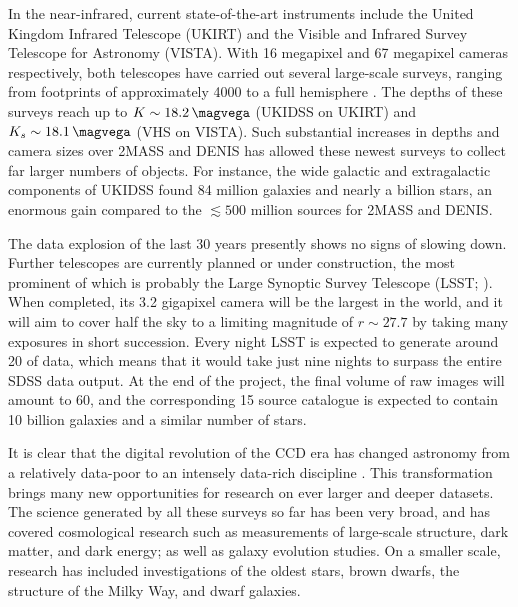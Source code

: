 In the near-infrared, current state-of-the-art instruments include the United Kingdom Infrared Telescope (UKIRT) and the Visible and Infrared Survey Telescope for Astronomy (VISTA). With 16 megapixel and 67 megapixel  cameras respectively, both telescopes have carried out several large-scale surveys, ranging from footprints of approximately \SI{4000}{\sqdeg} to a full hemisphere  \citep{2007MNRAS.379.1599L,2013Msngr.154...35M,2018MNRAS.473.5113D}. The depths of these surveys reach up to $K\sim \SI{18.2}{\magvega}$ (UKIDSS on UKIRT)  and  $K_{s}\sim\SI{18.1}{\magvega}$ (VHS on VISTA). Such substantial increases in depths and camera sizes over 2MASS and DENIS has allowed these newest surveys to collect far larger numbers of objects. For instance, the wide galactic and extragalactic components of UKIDSS found 84 million galaxies and nearly a billion stars, an enormous gain compared to the $\lesssim500$ million sources for 2MASS and DENIS. \par

The data explosion of the last 30 years presently shows no signs of slowing down. Further telescopes are currently planned or under construction, the most prominent of which is probably the Large Synoptic Survey Telescope (LSST; \citealt{2008SerAJ.176....1I}). When completed, its 3.2 gigapixel camera will be the largest in the world, and it will aim to cover half the sky to a limiting magnitude of $r\sim27.7$ by taking many exposures in short succession. Every night LSST is expected to generate around \SI{20}{\TB} of data, which means that it would take just nine nights to surpass the entire SDSS data output. At the end of the project, the final volume of raw images will amount to \SI{60}{\PB}, and the corresponding \SI{15}{\PB} source catalogue is expected to contain 10 billion galaxies and a similar number of stars. \par

It is clear that  the digital revolution of the CCD era has changed astronomy from a relatively data-poor to an intensely data-rich discipline \citep{2013pss2.book..223D}. This transformation brings many new opportunities for research on ever larger and deeper datasets. The science generated by all these surveys so far has been very broad, and has covered cosmological research such as measurements of large-scale structure, dark matter, and dark energy; as well as galaxy evolution studies. On a smaller scale, research has included investigations of the oldest stars, brown dwarfs, the structure of the Milky Way, and dwarf galaxies. \par


